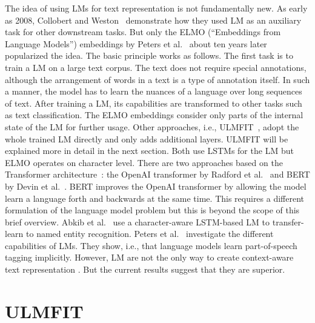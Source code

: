 The idea of using LMs for text representation is not fundamentally new. As early as 2008, Collobert and Weston~\cite{Collobert:2008:UAN:1390156.1390177} demonstrate how they used LM as an auxiliary task for other downstream tasks. But only the ELMO (``Embeddings from Language Models'') embeddings by Peters et al.~\cite{peters2018deep} about ten years later popularized the idea. The basic principle works as follows.
The first task is to train a LM on a large text corpus.
The text does not require special annotations, although the arrangement of words in a text is a type of annotation itself. In such a manner, the model has to learn the nuances of a language over long sequences of text. After training a LM, its capabilities are transformed to other tasks such as text classification. The ELMO embeddings consider only parts of the internal state of the LM for further usage. Other approaches, i.e., ULMFIT~\cite{howard2018universal}, adopt the whole trained LM directly and only adds additional layers. ULMFIT will be explained more in detail in the next section. Both use LSTMs for the LM but ELMO operates on character level. There are two approaches based on the Transformer architecture~\cite{NIPS2017_7181}: the OpenAI transformer by Radford et al.~\cite{radford2018improving, radford2019language} and BERT by Devin et al.~\cite{devlin2018bert}. BERT improves the OpenAI transformer by allowing the model learn a language forth and backwards at the same time. This requires a different formulation of the language model problem but this is beyond the scope of this brief overview. Abkib et al.~\cite{akbik_contextual_nodate} use a character-aware LSTM-based LM to transfer-learn to named entity recognition. Peters et al.~\cite{peters_dissecting_2018} investigate the different capabilities of LMs. They show, i.e., that language models learn part-of-speech tagging implicitly. However, LM are not the only way to create context-aware text representation \cite{D18-2029, mccann2017learned}.
 But the current results suggest that they are superior.

\section{ULMFIT}

